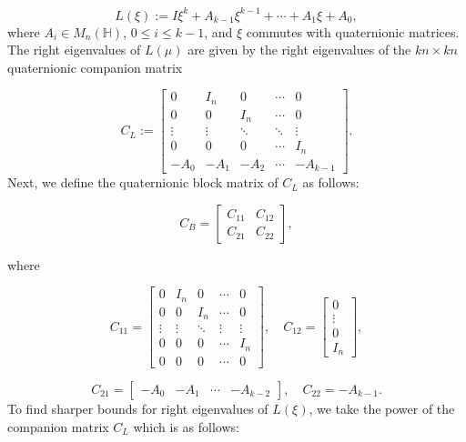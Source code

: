 \documentclass [12pt]{article}
\newcommand{\HH}{\mathbb{H}}
\begin{document}
\begin{equation}
    {L}(\xi) := I\xi^k + A_{k-1}\xi^{k-1} + \cdots + A_1\xi + A_0, \label{eq:02}
\end{equation}
where $A_i \in M_n(\HH)$, $0 \leq i \leq k-1$, and $\xi$ commutes with quaternionic matrices. The right eigenvalues of ${L}(\mu)$ are given by the right eigenvalues of the $kn \times kn$ quaternionic companion matrix

\[
C_L := 
\begin{bmatrix}
0 & I_n & 0 & \cdots & 0 \\
0 & 0 & I_n & \cdots & 0 \\
\vdots & \vdots & \ddots & \ddots & \vdots \\
0 & 0 & 0 & \cdots & I_n \\
-A_0 & -A_1 & -A_2 & \cdots & -A_{k-1}
\end{bmatrix}.
\]
Next, we define the quaternionic block  matrix of $C_L$ as follows:

\[
C_B = \begin{bmatrix} C_{11} & C_{12} \\ C_{21} & C_{22} \end{bmatrix},
\]

where

\[
C_{11} = 
\begin{bmatrix}
0 & I_n & 0 & \cdots & 0 \\
0 & 0 & I_n & \cdots & 0 \\
\vdots & \vdots & \ddots & \vdots & \vdots \\
0 & 0 & 0 & \cdots & I_n \\
0 & 0 & 0 & \cdots & 0
\end{bmatrix}, \quad C_{12} = 
\begin{bmatrix}
0 \\
\vdots \\
0\\
I_n
\end{bmatrix},
\]

\[
C_{21} = 
\begin{bmatrix}
-A_0 & -A_1 & \cdots & -A_{k-2}
\end{bmatrix}, \quad C_{22} = -A_{k-1}.
\]
To find sharper bounds for right eigenvalues of ${L}(\xi)$, we take the power of the companion matrix $C_L$ which is as follows:
\end{document}
